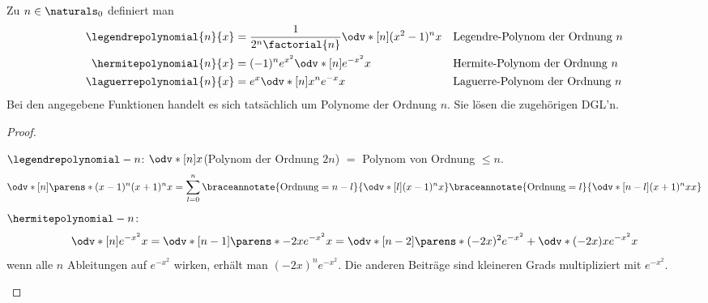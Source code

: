 \begin{lemma}
  Zu \( n\in \naturals_0 \) definiert man
  \begin{align*}
    \legendrepolynomial{n}{x}&=\frac{1}{2^n \factorial{n}}\odv*[n]{(x^2-1)^n}{x}&&\text{Legendre-Polynom der Ordnung \( n \)}\\
    \hermitepolynomial{n}{x}&=(-1)^n e^{x^2}\odv*[n]{e^{-x^2}}{x}&&\text{Hermite-Polynom der Ordnung \( n \)}\\
    \laguerrepolynomial{n}{x}&=e^x\odv*[n]{x^n e^{-x}}{x}&&\text{Laguerre-Polynom der Ordnung \( n \)}
  \end{align*}
  Bei den angegebene Funktionen handelt es sich tatsächlich um Polynome der Ordnung \( n \). Sie lösen die zugehörigen DGL'n.
\end{lemma}
\begin{proof}
  \begin{proofdescription}
    \item[\ordinalnum{1} \Beh] \( \legendrepolynomial-{n}{} \): \( \odv*[n]{}{x} \)(Polynom der Ordnung \( 2n \)) \( = \) Polynom von Ordnung \( \leq n \).
    \begin{equation*}
      \odv*[n]{\parens*{(x-1)^n(x+1)^n}}{x}=\sum_{l=0}^{n}\braceannotate{\text{Ordnung}=n-l}{\odv*[l]{(x-1)^n}{x}}\braceannotate{\text{Ordnung}=l}{\odv*[n-l]{(x+1)^n{x}}{x}}
    \end{equation*}
    \( \hermitepolynomial-{n}{} \):
    \begin{equation*}
      \odv*[n]{e^{-x^2}}{x}=\odv*[n-1]{\parens*{-2xe^{-x^2}}}{x}=\odv*[n-2]{\parens*{(-2x)^2e^{-x^2}+\odv*{(-2x)}{x}e^{-x^2}}}{x}
    \end{equation*}
    \timplies wenn alle \( n \) Ableitungen auf \( e^{-x^2} \) wirken, erhält man \( (-2x)^n e^{-x^2} \). Die anderen Beiträge sind kleineren Grads multipliziert mit \( e^{-x^2} \).


\end{proofdescription}
\end{proof}
